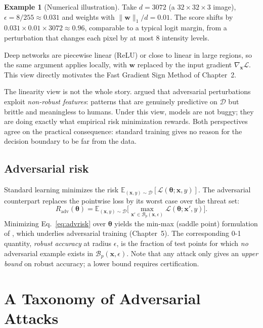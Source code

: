 \documentclass[10pt,a4paper]{extarticle}
\theoremstyle{definition}
\newtheorem{example}{Example}[section]
\newcommand{\D}{\mathcal{D}}
\newcommand{\Loss}{\mathcal{L}}
\newcommand{\x}{\mathbf{x}}
\newcommand{\xadv}{\mathbf{x}'}
\newcommand{\btheta}{\boldsymbol{\theta}}
\newcommand{\B}{\mathcal{B}}
\begin{document}
\begin{example}[Numerical illustration]
Take \(d = 3072\) (a \(32 \times 32 \times 3\) image), \(\epsilon = 8/255 \approx 0.031\) and weights with \(\|\mathbf{w}\|_1 / d = 0.01\). The score shifts by \(0.031 \times 0.01 \times 3072 \approx 0.96\), comparable to a typical logit margin, from a perturbation that changes each pixel by at most 8 intensity levels.
\end{example}

Deep networks are piecewise linear (ReLU) or close to linear in large regions, so the same argument applies locally, with \(\mathbf{w}\) replaced by the input gradient \(\nabla_{\x} \Loss\). This view directly motivates the Fast Gradient Sign Method of Chapter~2.

The linearity view is not the whole story. \citet{ilyas2019features} argued that adversarial perturbations exploit \emph{non-robust features}: patterns that are genuinely predictive on \(\D\) but brittle and meaningless to humans. Under this view, models are not buggy; they are doing exactly what empirical risk minimization rewards. Both perspectives agree on the practical consequence: standard training gives no reason for the decision boundary to be far from the data.

\subsection{Adversarial risk}

Standard learning minimizes the risk \(\mathbb{E}_{(\x,y)\sim\D}[\Loss(\btheta;\x,y)]\). The adversarial counterpart replaces the pointwise loss by its worst case over the threat set:
\begin{equation}\label{eq:advrisk}
R_{\text{adv}}(\btheta) = \mathbb{E}_{(\x,y)\sim\D}\Big[\max_{\xadv \in \B_p(\x,\epsilon)} \Loss(\btheta;\xadv,y)\Big].
\end{equation}
Minimizing Eq.~\eqref{eq:advrisk} over \(\btheta\) yields the min-max (saddle point) formulation of \citet{madry2018towards}, which underlies adversarial training (Chapter~5). The corresponding 0-1 quantity, \emph{robust accuracy} at radius \(\epsilon\), is the fraction of test points for which \emph{no} adversarial example exists in \(\B_p(\x,\epsilon)\). Note that any attack only gives an \emph{upper bound} on robust accuracy; a lower bound requires certification.

\section{A Taxonomy of Adversarial Attacks}
\end{document}
